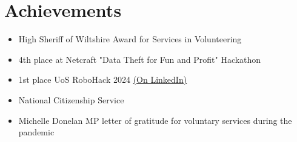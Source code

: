 \section*{Achievements}
\begin{itemize}
    \item High Sheriff of Wiltshire Award for Services in Volunteering
    \item 4th place at Netcraft "Data Theft for Fun and Profit" Hackathon
    \item 1st place UoS RoboHack 2024 \href{https://www.linkedin.com/posts/jaretwrintmore_thank-you-southampton-robotics-outreach-activity-7193962844659277824-ULeL}{(On LinkedIn)}
    \item National Citizenship Service
    \item Michelle Donelan MP letter of gratitude for voluntary services during the pandemic
\end{itemize}